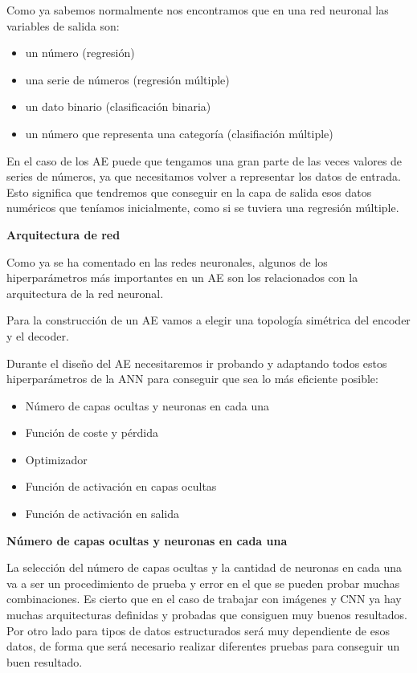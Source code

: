 \documentclass[
  a4paper,
  DIV=11,
  numbers=noendperiod]{scrreprt}
\providecommand{\tightlist}{%
  \setlength{\itemsep}{0pt}\setlength{\parskip}{0pt}}\usepackage{longtable,booktabs,array}
\begin{document}
Como ya sabemos normalmente nos encontramos que en una red neuronal las
variables de salida son:

\begin{itemize}
\tightlist
\item
  un número (regresión)
\item
  una serie de números (regresión múltiple)
\item
  un dato binario (clasificación binaria)
\item
  un número que representa una categoría (clasifiación múltiple)
\end{itemize}

En el caso de los AE puede que tengamos una gran parte de las veces
valores de series de números, ya que necesitamos volver a representar
los datos de entrada. Esto significa que tendremos que conseguir en la
capa de salida esos datos numéricos que teníamos inicialmente, como si
se tuviera una regresión múltiple.

\textbf{Arquitectura de red}

Como ya se ha comentado en las redes neuronales, algunos de los
hiperparámetros más importantes en un AE son los relacionados con la
arquitectura de la red neuronal.

Para la construcción de un AE vamos a elegir una topología simétrica del
encoder y el decoder.

Durante el diseño del AE necesitaremos ir probando y adaptando todos
estos hiperparámetros de la ANN para conseguir que sea lo más eficiente
posible:

\begin{itemize}
\item
  Número de capas ocultas y neuronas en cada una
\item
  Función de coste y pérdida
\item
  Optimizador
\item
  Función de activación en capas ocultas
\item
  Función de activación en salida
\end{itemize}

\textbf{Número de capas ocultas y neuronas en cada una}

La selección del número de capas ocultas y la cantidad de neuronas en
cada una va a ser un procedimiento de prueba y error en el que se pueden
probar muchas combinaciones. Es cierto que en el caso de trabajar con
imágenes y CNN ya hay muchas arquitecturas definidas y probadas que
consiguen muy buenos resultados. Por otro lado para tipos de datos
estructurados será muy dependiente de esos datos, de forma que será
necesario realizar diferentes pruebas para conseguir un buen resultado.
\end{document}
